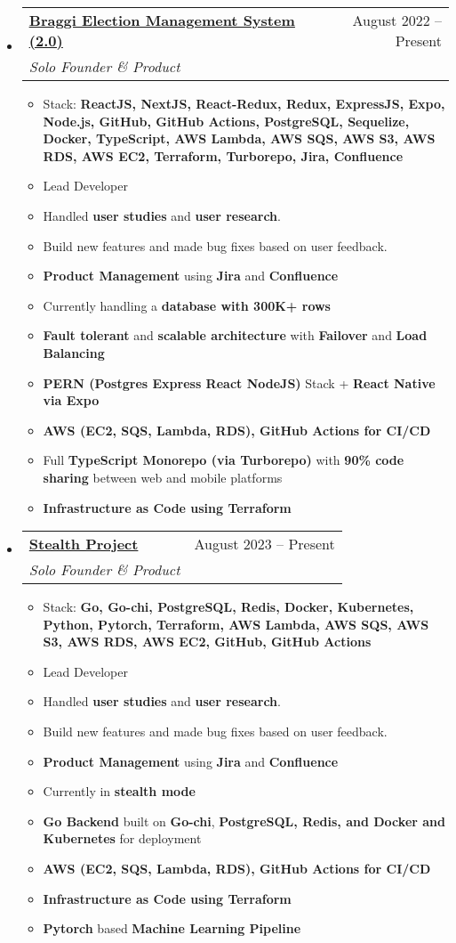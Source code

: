 \documentclass[a4paper,11pt]{article}
\makeatletter
\newcommand{\resumeItem}[1]{
  \item\large{#1}
}
\newcommand{\resumeItemListStart}{\begin{itemize}[rightmargin=0.11in]}
\newcommand{\resumeItemListEnd}{\end{itemize}}
\newcommand{\resumeQuadHeading}[4]{
  \item
  \begin{tabular*}{0.96\textwidth}[t]{l@{\extracolsep{\fill}}r}
    \textbf{#1} & #2 \\
    \textit{\large#3} & \textit{\large #4} \\
  \end{tabular*}
}
\newcommand{\resumeHeadingListStart}{
  \begin{itemize}[leftmargin=0.15in, label={}]
}
\newcommand{\resumeHeadingListEnd}{\end{itemize}}
\makeatother
\begin{document}
  \resumeHeadingListStart{}
  \resumeQuadHeading{\href{https://braggi-ems.com/}{\uline{Braggi Election Management System (2.0)}}}{August 2022 -- Present}
  {Solo Founder \& Product}{}
      \resumeItemListStart{}
		\large{Braggi Election Management System is built for those contesting in elections. It aims to help leaders better manage their party workers to ensure faster reach and acquisition of voters. After undergoing a major rewrite and taking the learnings from the success of the previous iteration, this is now capable of handling Country-wide voter data as well as multiple national parties from a single platform, while offering Machine Learning Powered Algorithms to offer Analytics.}
		\resumeItem{Stack: \textbf{ReactJS, NextJS, React-Redux, Redux, ExpressJS, Expo, Node.js, GitHub, GitHub Actions, PostgreSQL, Sequelize, Docker, TypeScript, AWS Lambda, AWS SQS, AWS S3, AWS RDS, AWS EC2, Terraform, Turborepo, Jira, Confluence}}
		\resumeItem{Lead Developer}
		\resumeItem{Handled \textbf{user studies} and \textbf{user research}.}
		\resumeItem{Build new features and made bug fixes based on user feedback.}
		\resumeItem{\textbf{Product Management} using \textbf{Jira} and \textbf{Confluence}}
		\resumeItem{Currently handling a \textbf{database with 300K+ rows}}
		\resumeItem{\textbf{Fault tolerant} and \textbf{scalable architecture} with \textbf{Failover} and \textbf{Load Balancing}}
		\resumeItem{\textbf{PERN (Postgres Express React NodeJS)} Stack + \textbf{React Native via Expo}}
		\resumeItem{\textbf{AWS (EC2, SQS, Lambda, RDS), GitHub Actions for CI/CD}}
		\resumeItem{Full \textbf{TypeScript Monorepo (via Turborepo)} with \textbf{90\% code sharing} between web and mobile platforms}
		\resumeItem{\textbf{Infrastructure as Code using Terraform}}
      \resumeItemListEnd{}
  \resumeHeadingListEnd{}

  \resumeHeadingListStart{}
  \resumeQuadHeading{{\uline{Stealth Project}}}{August 2023 -- Present}
  {Solo Founder \& Product}{}
      \resumeItemListStart{}
		\large{A stealth project that I am currently working on in parallel with my other projects, It is in the Health \& Fitness domain. This is a project that I am very excited about.}
		\resumeItem{Stack: \textbf{Go,
			Go-chi,
			PostgreSQL,
			Redis,
			Docker,
			Kubernetes,
			Python,
			Pytorch,
			Terraform,
			AWS Lambda,
			AWS SQS,
			AWS S3,
			AWS RDS,
			AWS EC2,
			GitHub,
			GitHub Actions}}
		\resumeItem{Lead Developer}
		\resumeItem{Handled \textbf{user studies} and \textbf{user research}.}
		\resumeItem{Build new features and made bug fixes based on user feedback.}
		\resumeItem{\textbf{Product Management} using \textbf{Jira} and \textbf{Confluence}}
		\resumeItem{Currently in \textbf{stealth mode}}
		\resumeItem{\textbf{Go Backend} built on \textbf{Go-chi}, \textbf{PostgreSQL, Redis, and Docker and Kubernetes} for deployment}
		\resumeItem{\textbf{AWS (EC2, SQS, Lambda, RDS), GitHub Actions for CI/CD}}
		\resumeItem{\textbf{Infrastructure as Code using Terraform}}
		\resumeItem{\textbf{Pytorch} based \textbf{Machine Learning Pipeline}}
      \resumeItemListEnd{}
  \resumeHeadingListEnd{}
\end{document}
